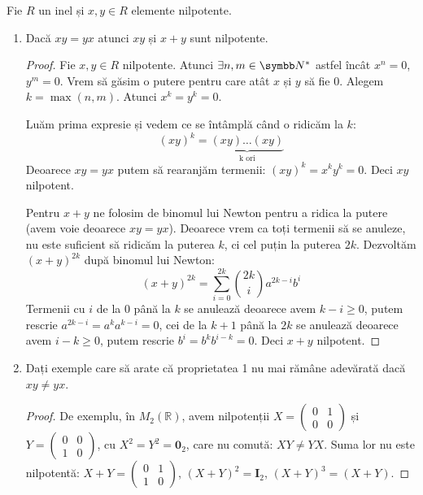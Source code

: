 \begin{exercise}[1.23]
Fie \(R\) un inel și \(x, y \in R\) elemente nilpotente.
\begin{enumerate}
    \item Dacă \(xy = yx\) atunci \(xy\) și \(x + y\) sunt nilpotente.
    \begin{proof}
    Fie \(x, y \in R\) nilpotente. Atunci \(\exists n, m \in \naturals^*\) astfel încât \(x^n = 0\), \(y^m = 0\). Vrem să găsim o putere pentru care atât \(x\) și \(y\) să fie 0. Alegem \(k = \max{(n, m)}\). Atunci \(x^k = y^k = 0\).
    
    Luăm prima expresie și vedem ce se întâmplă când o ridicăm la \(k\):
    \[(xy)^k = \underbrace{(xy)\dots(xy)}_{\text{k ori}}\]
    Deoarece \(xy = yx\) putem să rearanjăm termenii: \((xy)^k = x^k y^k = 0\).
    Deci \(xy\) nilpotent.
    
    Pentru \(x + y\) ne folosim de binomul lui Newton pentru a ridica la putere (avem voie deoarece \(xy = yx\)). Deoarece vrem ca toți termenii să se anuleze, nu este suficient să ridicăm la puterea \(k\), ci cel puțin la puterea \(2k\). Dezvoltăm \((x + y)^{2k}\) după binomul lui Newton:
    \[
    (x + y)^{2k} = \sum\limits_{i = 0}^{2k}{\binom{2k}{i}}a^{2k-i}b^{i}
    \]
    Termenii cu \(i\) de la 0 până la \(k\) se anulează deoarece avem \(k - i \geq 0\), putem rescrie \(a^{2k - i} = a^k a^{k - i} = 0\), cei de la \(k + 1\) până la \(2k\) se anulează deoarece avem \(i - k \geq 0\), putem rescrie \(b^{i} = b^{k} b^{i - k} = 0\).
    Deci \(x + y\) nilpotent.
    \end{proof}
    
    \item Dați exemple care să arate că proprietatea 1 nu mai rămâne adevărată dacă \(xy \neq yx\).
    \begin{proof}
    De exemplu, în \(M_2(\mathbb{R})\), avem nilpotenții \(X = \begin{pmatrix}0 & 1 \\ 0 & 0\end{pmatrix}\) și \(Y = \begin{pmatrix}0 & 0 \\ 1 & 0\end{pmatrix}\), cu \(X^2 = Y^2 = \mathbf{0}_2\), care nu comută: \(XY \neq YX\). Suma lor nu este nilpotentă: \(X + Y = \begin{pmatrix}0 & 1 \\ 1 & 0\end{pmatrix}\), \((X + Y)^2 = \mathbf{I}_2\), \((X + Y)^3 = (X + Y)\).
    \end{proof}
\end{enumerate}
\end{exercise}

